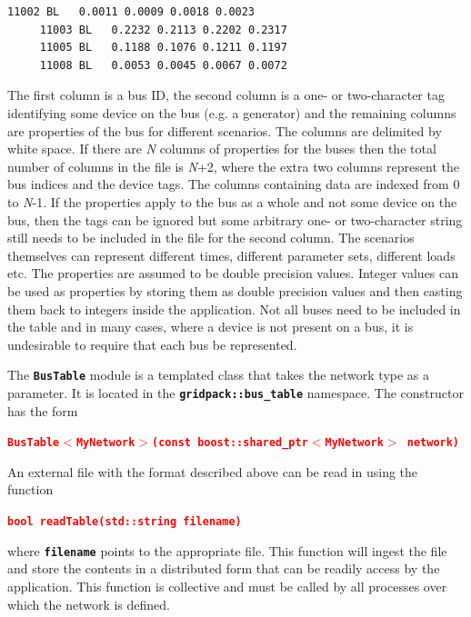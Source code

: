 \documentclass[12pt]{report} %
\begin{document}
{
\color{red}
\bfseries
\begin{Verbatim}[commandchars=\\\{\}]
     11002 BL   0.0011 0.0009 0.0018 0.0023
     11003 BL   0.2232 0.2113 0.2202 0.2317
     11005 BL   0.1188 0.1076 0.1211 0.1197
     11008 BL   0.0053 0.0045 0.0067 0.0072
\end{Verbatim}
}

The first column is a bus ID, the second column is a one- or two-character tag identifying some device on the bus (e.g. a generator) and the remaining columns are properties of the bus for different scenarios. The columns are delimited by white space. If there are \textit{N} columns of properties for the buses then the total number of columns in the file is \textit{N}+2, where the extra two columns represent the bus indices and the device tags. The columns containing data are indexed from 0 to \textit{N}-1. If the properties apply to the bus as a whole and not some device on the bus, then the tags can be ignored but some arbitrary one- or two-character string still needs to be included in the file for the second column. The scenarios themselves can represent different times, different parameter sets, different loads etc. The properties are assumed to be double precision values. Integer values can be used as properties by storing them as double precision values and then casting them back to integers inside the application. Not all buses need to be included in the table and in many cases, where a device is not present on a bus, it is undesirable to require that each bus be represented.

The \texttt{\textbf{BusTable}} module is a templated class that takes the network type as a parameter.  It is located in the \texttt{\textbf{gridpack::bus\_table}} namespace. The constructor has the form

\textcolor{red}{\texttt{\textbf{BusTable$\boldsymbol{\mathrm{<}}$MyNetwork$\boldsymbol{\mathrm{>}}$(const boost::shared\_ptr$\boldsymbol{\mathrm{<}}$MyNetwork$\boldsymbol{\mathrm{>}}$ network)}}}

An external file with the format described above can be read in using the function

\textcolor{red}{\texttt{\textbf{bool readTable(std::string filename)}}}

where \texttt{\textbf{filename}} points to the appropriate file. This function will ingest the file and store the contents in a distributed form that can be readily access by the application. This function is collective and must be called by all processes over which the network is defined.
\end{document}
